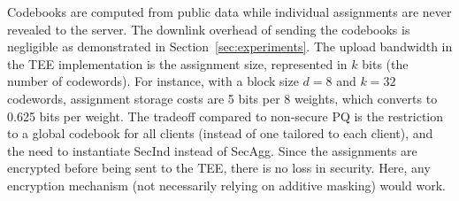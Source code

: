 \documentclass[11pt]{article}
\makeatletter
\newcommand{\SecInd}{{\sc SecInd}\xspace}
\newcommand{\SecAgg}{{\sc SecAgg}\xspace}
\def\ie{\textit{i.e.,}\@\xspace}
\newcommand{\karthik}[1]{{\color{blue}Karthik: #1}}
\newcommand{\ashkan}[1]{{\color{blue}Ashkan: #1}}
\newcommand{\modif}[1]{{\color{black}#1}}
\makeatother
\begin{document}



\modif{}
Codebooks are computed from public data while individual assignments are never revealed to the server.
The downlink overhead of sending the codebooks is negligible as demonstrated in Section~\ref{sec:experiments}.
The upload bandwidth in the TEE implementation is the assignment size, represented in $k$ bits (the number of codewords).
For instance, with a block size $d=8$ and $k=32$ codewords, assignment storage costs are 5 bits per 8 weights, which converts to 0.625 bits per weight.
The tradeoff compared to non-secure PQ is the restriction to a global codebook for all clients (instead of one tailored to each client), and the need to instantiate \SecInd instead of \SecAgg. \modif{Since the assignments are encrypted before being sent to the TEE, there is no loss in security. Here, any encryption mechanism (not necessarily relying on additive masking) would work.}
\end{document}
